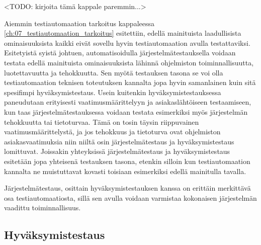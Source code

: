 

    <TODO: kirjoita tämä kappale paremmin...>

    Aiemmin testiautomaation tarkoitus kappaleessa \ref{ch:07_testiautomaation_tarkoitus} esitettiin, edellä mainituista laadullisista ominaisuuksista kaikki eivät sovellu hyvin testiautomaation avulla testattaviksi.
    Esitetyistä syistä johtuen, automatisoidulla järjestelmätestauksella voidaan testata edellä mainituista ominaisuuksista lähinnä ohjelmiston toiminnallisuutta, luotettavuutta ja tehokkuutta.
    Sen myötä testauksen tasona se voi olla testiautomaation teknisen toteutuksen kannalta jopa hyvin samanlainen kuin sitä spesifimpi hyväksymistestaus.
    Usein kuitenkin hyväksymistestauksessa paneudutaan erityisesti vaatimusmäärittelyyn ja asiakaslähtöiseen testaamiseen, kun taas järjestelmätestauksessa voidaan testata esimerkiksi myös järjestelmän tehokkuutta tai tietoturvaa.
    Tämä on tosin täysin riippuvainen vaatimusmäärittelystä, ja jos tehokkuus ja tietoturva ovat ohjelmiston asiakasvaatimuksia niin niiltä osin järjestelmätestaus ja hyväksymistestaus lomittuvat.
    Joissakin yhteyksissä järjestelmätestaus ja hyväksymistestaus esitetään jopa yhteisenä testauksen tasona, etenkin silloin kun testiautomaation kannalta ne muistuttavat kovasti toisiaan esimerkiksi edellä mainitulla tavalla.

    Järjestelmätestaus, osittain hyväksymistestauksen kanssa on erittäin merkittävä osa testiautomaatiosta, sillä sen avulla voidaan varmistaa kokonaisen järjestelmän vaadittu toiminnallisuus.

  \subsection{Hyväksymistestaus} \label{ch:07_hyvaksymistestaus}

